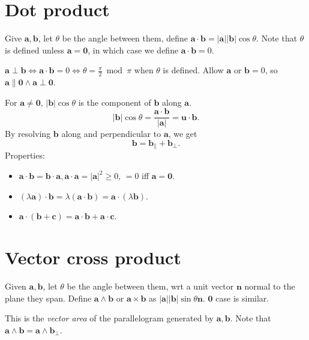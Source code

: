 \documentclass[10pt]{article}
\def\ge{\geqslant}
\begin{document}
    \section{Dot product}
    \begin{definition}
        Give $ \mathbf{a}, \mathbf{b} $, let $ \theta $ be the angle between them, define $ \mathbf{a}\cdot\mathbf{b}=|\mathbf{a}||\mathbf{b}|\cos \theta $. Note that $ \theta $ is defined unless $ \mathbf{a}=\mathbf{0} $, in which case we define $ \mathbf{a}\cdot \mathbf{b}=0 $.

        $ \mathbf{a}\perp\mathbf{b} \Leftrightarrow \mathbf{a}\cdot \mathbf{b}=0 \Leftrightarrow \theta=\frac{\pi}{2}\bmod \pi $ when $ \theta $ is defined. Allow $ \mathbf{a} $ or $ \mathbf{b}=0 $, so $ \mathbf{a} \parallel \mathbf{0} \land \mathbf{a} \perp \mathbf{0} $.
    \end{definition}
    For $ \mathbf{a}\neq \mathbf{0} $, $ |\mathbf{b}|\cos \theta $ is the component of $ \mathbf{b} $ along $ \mathbf{a} $.
    \[
        \left| \mathbf{b} \right| \cos \theta = \frac{\mathbf{a}\cdot \mathbf{b}}{|\mathbf{a}|}=\mathbf{u}\cdot \mathbf{b}
    .\]
    By resolving $ \mathbf{b} $ along and perpendicular to $ \mathbf{a} $, we get 
    \[
        \mathbf{b} = \mathbf{b}_{\parallel} + \mathbf{b}_{\perp }
    .\]
    Properties:
    \begin{itemize}
        \item $ \mathbf{a}\cdot \mathbf{b}=\mathbf{b}\cdot \mathbf{a}, \mathbf{a}\cdot \mathbf{a}=|\mathbf{a}|^2\ge 0 $, $ =0 $ iff $ \mathbf{a}=\mathbf{0} $.
        \item $ (\lambda \mathbf{a})\cdot \mathbf{b}=\lambda (\mathbf{a}\cdot \mathbf{b})=\mathbf{a}\cdot (\lambda \mathbf{b}) $.
        \item $ \mathbf{a}\cdot (\mathbf{b}+\mathbf{c})=\mathbf{a}\cdot \mathbf{b}+\mathbf{a}\cdot \mathbf{c} $.
    \end{itemize}
    \section{Vector cross product}
    \begin{definition}
        Given $ \mathbf{a},\mathbf{b} $, let $ \theta $ be the angle between them, wrt a unit vector $ \mathbf{n} $ normal to the plane they span. Define $ \mathbf{a} \wedge \mathbf{b} $ or $ \mathbf{a} \times \mathbf{b} $ as $ |\mathbf{a}||\mathbf{b}|\sin \theta \mathbf{n} $. $ \mathbf{0} $ case is similar.
    \end{definition}
    This is the \textit{vector area} of the parallelogram generated by $ \mathbf{a}, \mathbf{b} $. Note that $ \mathbf{a} \wedge \mathbf{b} = \mathbf{a} \wedge \mathbf{b}_{\perp } $.
\end{document}
